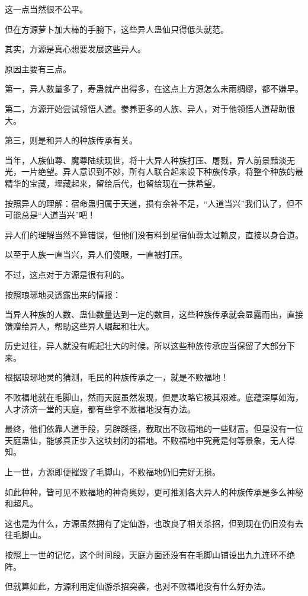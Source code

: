 \begin{this_body}
这一点当然很不公平。

但在方源萝卜加大棒的手腕下，这些异人蛊仙只得低头就范。

其实，方源是真心想要发展这些异人。

原因主要有三点。

第一，异人数量多了，寿蛊就产出得多，在这点上方源怎么未雨绸缪，都不嫌早。

第二，方源开始尝试领悟人道。豢养更多的人族、异人，对于他领悟人道帮助很大。

第三，则是和异人的种族传承有关。

当年，人族仙尊、魔尊陆续现世，将十大异人种族打压、屠戮，异人前景黯淡无光，一片绝望。异人意识到不妙，所有人联合起来设下种族传承，将整个种族的最精华的宝藏，埋藏起来，留给后代，也留给现在一抹希望。

按照异人的理解：宿命蛊归属于天道，损有余补不足，“人道当兴”我们认了，但不可能总是“人道当兴”吧！

异人们的理解当然不算错误，但他们没有料到星宿仙尊太过赖皮，直接以身合道。

以至于人族一直当兴，异人们傻眼，一直被打压。

不过，这点对于方源是很有利的。

按照琅琊地灵透露出来的情报：

当异人种族的人数、蛊仙数量达到一定的数目，这些种族传承就会显露而出，直接馈赠给异人，帮助这些异人崛起和壮大。

历史过往，异人就没有崛起壮大的时候，所以这些种族传承应当保留了大部分下来。

根据琅琊地灵的猜测，毛民的种族传承之一，就是不败福地！

不败福地就在毛脚山，然而天庭虽然发现，但是攻略它极其艰难。底蕴深厚如海，人才济济一堂的天庭，都有些拿不败福地没有办法。

最终，他们依靠人道手段，另辟蹊径，截取出不败福地的一些财富。但是没有一位天庭蛊仙，能够真正步入这块封闭的福地。不败福地中究竟是何等景象，无人得知。

上一世，方源即便摧毁了毛脚山，不败福地仍旧完好无损。

如此种种，皆可见不败福地的神奇奥妙，更可推测各大异人的种族传承是多么神秘和超凡。

这也是为什么，方源虽然拥有了定仙游，也改良了相关杀招，但到现在仍旧没有去往毛脚山。

按照上一世的记忆，这个时间段，天庭方面还没有在毛脚山铺设出九九连环不绝阵。

但就算如此，方源利用定仙游杀招突袭，也对不败福地没有什么好办法。


\end{this_body}
